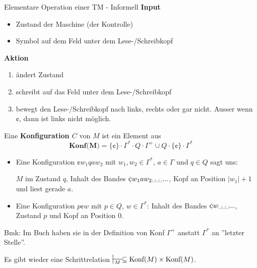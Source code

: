         \begin{mainbox}{Elementare Operation einer TM - Informell}
            \textbf{Input}
            \begin{itemize}[label = -]
                \item Zustand der Maschine (der Kontrolle)
                \item Symbol auf dem Feld unter dem Lese-/Schreibkopf
            \end{itemize}
            \textbf{Aktion}
            \begin{enumerate}[label=(\roman*)]
                \item ändert Zustand
                \item schreibt auf das Feld unter dem Lese-/Schreibkopf
                \item bewegt den Lese-/Schreibkopf nach links, rechts oder gar nicht. Ausser wenn $\cent$, dann ist links nicht möglich.
            \end{enumerate}
        \end{mainbox}
    
        \begin{mainbox}{}
            Eine \textbf{Konfiguration $C$} von $M$ ist ein Element aus 
            $$\textbf{Konf($\mathbf{M}$)} =  \{\cent\} \cdot \Gamma^* \cdot Q \cdot \Gamma^+ \cup Q \cdot \{\cent\} \cdot \Gamma^*$$
        \end{mainbox}
        \begin{itemize}[label=-]
            \item Eine Konfiguration $\cent w_1qaw_2$ mit $w_1, w_2 \in \Gamma^*$, $a \in \Gamma$ und $q \in Q$ sagt uns:
            
            $M$ im Zustand $q$, Inhalt des Bandes $\cent w_1aw_2 \text{\textvisiblespace} \text{\textvisiblespace} \text{\textvisiblespace}...$, Kopf an Position $|w_1|+1$ und liest gerade $a$.
            \item Eine Konfiguration $p\cent w$ mit $p \in Q$, $w\in \Gamma^*$: Inhalt des Bandes $\cent w \text{\textvisiblespace}  \text{\textvisiblespace}  \text{\textvisiblespace}...$, Zustand $p$ und Kopf an Position $0$. 
        \end{itemize}
        Bmk: Im Buch haben sie in der Definition von Konf $\Gamma^+$ anstatt $\Gamma^*$ an ''letzter Stelle''.
    
        Es gibt wieder eine Schrittrelation $\sststile{M}{} \subseteq \text{Konf}(M) \times \text{Konf}(M)$.
    
